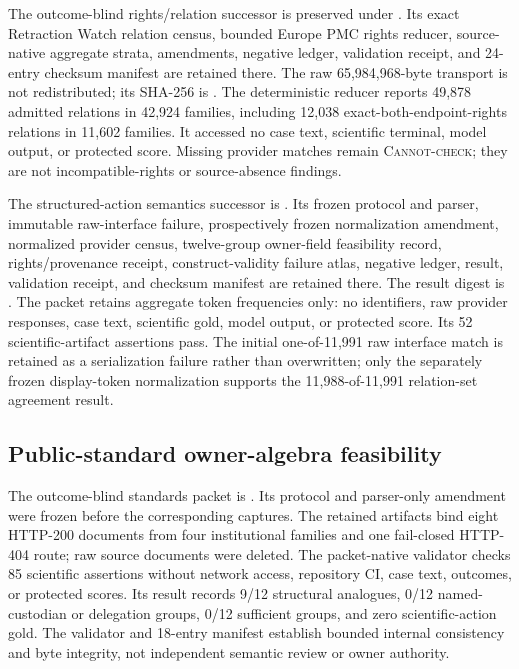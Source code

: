 The outcome-blind rights/relation successor is preserved under
. Its exact
Retraction Watch relation census, bounded Europe PMC rights reducer,
source-native aggregate strata, amendments, negative ledger, validation
receipt, and 24-entry checksum manifest are retained there. The raw
65,984,968-byte transport is not redistributed; its SHA-256 is
.
The deterministic reducer reports 49,878 admitted relations in 42,924
families, including 12,038 exact-both-endpoint-rights relations in 11,602
families. It accessed no case text, scientific terminal, model output, or
protected score. Missing provider matches remain \textsc{Cannot-check}; they
are not incompatible-rights or source-absence findings.

The structured-action semantics successor is
. Its frozen
protocol and parser, immutable raw-interface failure, prospectively frozen
normalization amendment, normalized provider census, twelve-group owner-field
feasibility record, rights/provenance receipt, construct-validity failure atlas,
negative ledger, result, validation receipt, and checksum manifest are retained
there. The result digest is
.
The packet retains aggregate token frequencies only: no identifiers, raw
provider responses, case text, scientific gold, model output, or protected
score. Its 52 scientific-artifact assertions pass. The initial one-of-11,991
raw interface match is retained as a serialization failure rather than
overwritten; only the separately frozen display-token normalization supports
the 11,988-of-11,991 relation-set agreement result.

\subsection{Public-standard owner-algebra feasibility}
The outcome-blind standards packet is
.
Its protocol and parser-only amendment were frozen before the corresponding
captures. The retained artifacts bind eight HTTP-200 documents from four
institutional families and one fail-closed HTTP-404 route; raw source documents
were deleted. The packet-native validator checks 85 scientific assertions
without network access, repository CI, case text, outcomes, or protected
scores. Its result records 9/12 structural analogues, 0/12 named-custodian or
delegation groups, 0/12 sufficient groups, and zero scientific-action gold.
The validator and 18-entry manifest establish bounded internal consistency and
byte integrity, not independent semantic review or owner authority.

